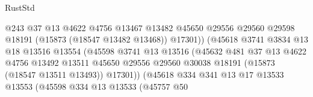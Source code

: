 \begin{lexlean}{RustStd}
\begin{coremodule}
                                          @243
                                          @37
                                          @13
                                          @4622
                                          @4756
                                          @13467
                                          @13482
                                          @45650
                                          @29556
                                          @29560
                                          @29598
                                          @18191
                                          (@15873 (@18547 @13482 @13468))
                                          @17301))
                                      (@45618
                                        @3741
                                        @3834
                                        @13
                                        @18
                                        @13516
                                        @13554
                                        (@45598
                                          @3741
                                          @13
                                          @13516
                                          (@45632
                                            @481
                                            @37
                                            @13
                                            @4622
                                            @4756
                                            @13492
                                            @13511
                                            @45650
                                            @29556
                                            @29560
                                            @30038
                                            @18191
                                            (@15873 (@18547 @13511 @13493))
                                            @17301))
                                        (@45618
                                          @334
                                          @341
                                          @13
                                          @17
                                          @13533
                                          @13553
                                          (@45598
                                            @334
                                            @13
                                            @13533
                                            (@45757
                                              @50

\end{coremodule}
\end{lexlean}
